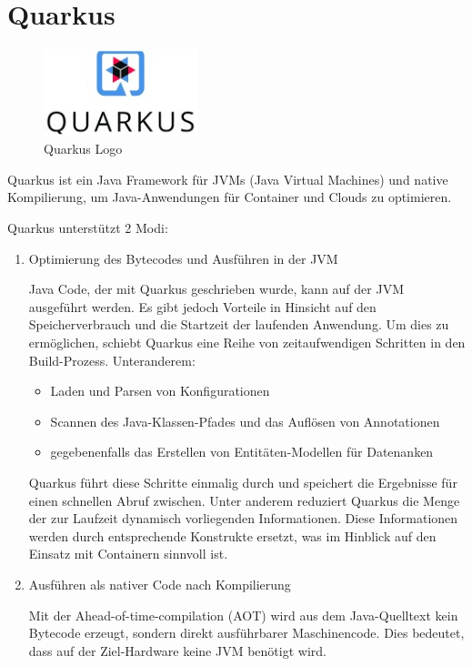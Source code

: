 \section{Quarkus}
\begin{figure}
    \begin{center}
      \includegraphics[width=0.4\textwidth]{pics/Quarkus_logo.jpg}
      \caption{Quarkus Logo ~\cite{quarkus_logo}}
    \end{center}
\end{figure}

Quarkus ist ein Java Framework für JVMs (Java Virtual Machines) und native Kompilierung, um Java-Anwendungen 
für Container und Clouds zu optimieren.
~\cite{quarkus_redhat}

Quarkus unterstützt 2 Modi:
\begin{enumerate}
\item Optimierung des Bytecodes und Ausführen in der JVM

Java Code, der mit Quarkus geschrieben wurde, kann auf der JVM ausgeführt werden.
Es gibt jedoch Vorteile in Hinsicht auf den Speicherverbrauch und die Startzeit der laufenden Anwendung.
Um dies zu ermöglichen, schiebt Quarkus eine Reihe von zeitaufwendigen Schritten in den Build-Prozess.
Unteranderem:

   \begin{itemize}
     \item Laden und Parsen von Konfigurationen
     \item  Scannen des Java-Klassen-Pfades und das Auflösen von Annotationen
     \item  gegebenenfalls das Erstellen von Entitäten-Modellen für Datenanken
   \end{itemize}

   Quarkus führt diese Schritte einmalig durch und speichert die Ergebnisse für einen schnellen Abruf zwischen.
   \newline
   Unter anderem reduziert Quarkus die Menge der zur Laufzeit dynamisch vorliegenden Informationen. 
   Diese Informationen werden durch entsprechende Konstrukte ersetzt, 
   was im Hinblick auf den Einsatz mit Containern sinnvoll ist. 

\item Ausführen als nativer Code nach Kompilierung

Mit der Ahead-of-time-compilation (AOT) wird aus dem Java-Quelltext kein Bytecode erzeugt, 
sondern direkt ausführbarer Maschinencode. Dies bedeutet, dass auf der Ziel-Hardware keine JVM benötigt wird.
\end{enumerate}
~\cite{quarkus_ionos}

